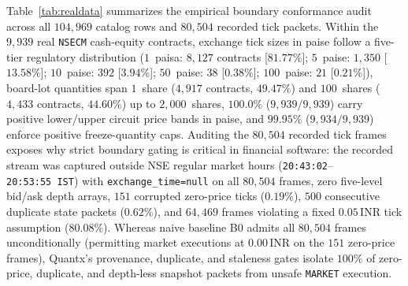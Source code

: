 \documentclass[journal,onecolumn,10pt]{IEEEtran}
\newcommand{\thinunit}[2]{#1\,\text{#2}}
\begin{document}
Table~\ref{tab:realdata} summarizes the empirical boundary conformance audit across all $104{,}969$ catalog rows and $80{,}504$ recorded tick packets. Within the $9{,}939$ real \texttt{NSECM} cash-equity contracts, exchange tick sizes in paise follow a five-tier regulatory distribution ($1$~paisa: $8{,}127$ contracts [$81.77\%$]; $5$~paise: $1{,}350$ [$13.58\%$]; $10$~paise: $392$ [$3.94\%$]; $50$~paise: $38$ [$0.38\%$]; $100$~paise: $21$ [$0.21\%$]), board-lot quantities span $1$~share ($4{,}917$ contracts, $49.47\%$) and $100$~shares ($4{,}433$ contracts, $44.60\%$) up to $2{,}000$~shares, $100.0\%$ ($9{,}939/9{,}939$) carry positive lower/upper circuit price bands in paise, and $99.95\%$ ($9{,}934/9{,}939$) enforce positive freeze-quantity caps. Auditing the $80{,}504$ recorded tick frames exposes why strict boundary gating is critical in financial software: the recorded stream was captured outside NSE regular market hours (\texttt{20:43:02}--\texttt{20:53:55~IST}) with \texttt{exchange\_time=null} on all $80{,}504$ frames, zero five-level bid/ask depth arrays, $151$ corrupted zero-price ticks ($0.19\%$), $500$ consecutive duplicate state packets ($0.62\%$), and $64{,}469$ frames violating a fixed $\thinunit{0.05}{INR}$ tick assumption ($80.08\%$). Whereas naive baseline B0 admits all $80{,}504$ frames unconditionally (permitting market executions at $\thinunit{0.00}{INR}$ on the $151$ zero-price frames), Quantx's provenance, duplicate, and staleness gates isolate $100\%$ of zero-price, duplicate, and depth-less snapshot packets from unsafe \texttt{MARKET} execution.
\end{document}
